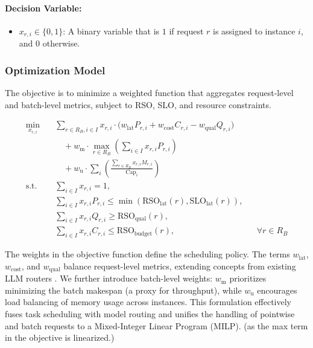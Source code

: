 \documentclass[letterpaper, anonymous, twocolumn, 10pt]{article}
\begin{document}
\paragraph{Decision Variable:}
\begin{itemize}
    \item $x_{r,i} \in \{0,1\}$: A binary variable that is $1$ if request $r$ is assigned to instance $i$, and $0$ otherwise.
\end{itemize}

\subsubsection{Optimization Model}
The objective is to minimize a weighted function that aggregates request-level and batch-level metrics, subject to RSO, SLO, and resource constraints.

\begin{equation}
\begin{aligned}
\min_{x_{r,i}} \quad
& \sum_{r\in R_B, i\in I} x_{r,i} \cdot \Big(w_{\text{lat}} P_{r,i} + w_{\text{cost}} C_{r,i} - w_{\text{qual}} Q_{r,i} \Big) \\
& \quad + w_{\text{m}} \cdot \max_{r \in R_B} \left( \sum_{i \in I} x_{r,i} P_{r,i} \right) \\
& \quad + w_{\text{u}} \cdot \sum_i \left( \frac{\sum_{r\in R_B} x_{r,i} M_{r,i}}{\mathrm{Cap}_i}\right) \\
\text{s.t.}\quad
& \sum_{i \in I} x_{r,i} = 1, \\
& \sum_{i \in I} x_{r,i} P_{r,i} \le \min(\mathrm{RSO}_{\text{lat}}(r), \mathrm{SLO}_{\text{lat}}(r)), \\
& \sum_{i \in I} x_{r,i} Q_{r,i} \ge \mathrm{RSO}_{\text{qual}}(r), \\
& \sum_{i \in I} x_{r,i} C_{r,i} \le \mathrm{RSO}_{\text{budget}}(r), && \forall r \in R_B
\end{aligned}
\end{equation}

The weights in the objective function define the scheduling policy. The terms $w_{\text{lat}}$, $w_{\text{cost}}$, and $w_{\text{qual}}$ balance request-level metrics, extending concepts from existing LLM routers \cite{universal_model_routering}. We further introduce batch-level weights: $w_{\text{m}}$ prioritizes minimizing the batch makespan (a proxy for throughput), while $w_{\text{u}}$ encourages load balancing of memory usage across instances. This formulation effectively fuses task scheduling with model routing and unifies the handling of pointwise and batch requests to a Mixed-Integer Linear Program (MILP). (as the max term in the objective is linearized.) 
\end{document}
